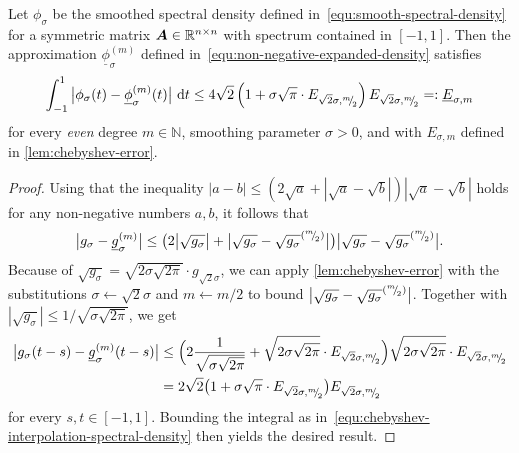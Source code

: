 \begin{lemma}\label{lem:non-negative-chebyshev-error}
Let $\phi_{\sigma}$ be the smoothed spectral density defined in~\cref{equ:smooth-spectral-density}
for a symmetric matrix $\boldsymbol{A} \in \mathbb{R}^{n \times n}$ with spectrum contained in $[-1, 1]$. Then the approximation $\underline{\phi}_{\sigma}^{(m)}$ defined in~\cref{equ:non-negative-expanded-density} satisfies
    \begin{equation*}
        \int_{-1}^{1} \big| \phi_{\sigma}(t) - \underline{\phi}_{\sigma}^{(m)}(t) \big|~\mathrm{d}t \leq 4 \sqrt{2} \left(1 + \sigma \sqrt{\pi} \cdot E_{\sqrt{2}\sigma, {}^{m}{\mskip -5mu/\mskip -3mu}_{2}}\right) E_{\sqrt{2}\sigma, {}^{m}{\mskip -5mu/\mskip -3mu}_{2}} =: \underline{E}_{\sigma, m}
        \label{equ:chebyshev-interpolation-sup-error-kernel-nonneg}
    \end{equation*}
    for every \emph{even} degree $m \in \mathbb{N}$, smoothing parameter $\sigma > 0$, and with $E_{\sigma, m}$ defined in \cref{lem:chebyshev-error}.
\end{lemma}
\begin{proof}
    Using that the inequality $| a - b | \leq (2 \sqrt{a} + | \sqrt{a} - \sqrt{b} |)  | \sqrt{a} - \sqrt{b} |$ holds for any non-negative numbers $a, b$, it follows that
    \begin{equation*}
        \big| g_{\sigma} - \underline{g}_{\sigma}^{(m)} \big| \leq \big( 2 \big| \sqrt{g_{\sigma}} \big| + \big| \sqrt{g_{\sigma}} - \sqrt{g_{\sigma}}^{({}^{m}{\mskip -5mu/\mskip -3mu}_{2})} \big| \big) \big| \sqrt{g_{\sigma}} - \sqrt{g_{\sigma}}^{({}^{m}{\mskip -5mu/\mskip -3mu}_{2})} \big|.
    \end{equation*}
    Because of $\sqrt{g_{\sigma}} = \sqrt{2 \sigma \sqrt{2 \pi}} \cdot g_{\sqrt{2}\sigma}$,
we can apply \cref{lem:chebyshev-error} with the substitutions
    $\sigma \gets \sqrt{2}\sigma$ and $m \gets m/2$ to bound 
    $\big| \sqrt{g_{\sigma}} - \sqrt{g_{\sigma}}^{({}^{m}{\mskip -5mu/\mskip -3mu}_{2})} \big|$.
    Together with  $|\sqrt{g_{\sigma}}| \leq 1/\sqrt{\sigma \sqrt{2 \pi}}$, we get
    \begin{align*}
        \big| g_{\sigma}(t - s) - \underline{g}_{\sigma}^{(m)}(t - s) \big| \notag 
        &\leq \Big( 2 \frac{1}{\sqrt{ \sigma \sqrt{2\pi}}} + \sqrt{2 \sigma \sqrt{2 \pi}} \cdot E_{\sqrt{2}\sigma, {}^{m}{\mskip -5mu/\mskip -3mu}_{2}}\Big)\sqrt{2 \sigma \sqrt{2 \pi}} \cdot E_{\sqrt{2}\sigma, {}^{m}{\mskip -5mu/\mskip -3mu}_{2}} \notag \\
        &= 2\sqrt{2} \big(1 + \sigma \sqrt{\pi} \cdot E_{\sqrt{2}\sigma, {}^{m}{\mskip -5mu/\mskip -3mu}_{2}}\big) E_{\sqrt{2}\sigma, {}^{m}{\mskip -5mu/\mskip -3mu}_{2}}
    \end{align*}
    for every $s,t \in [-1, 1]$.
    Bounding the integral as in~\cref{equ:chebyshev-interpolation-spectral-density} then yields the desired result.
\end{proof}

